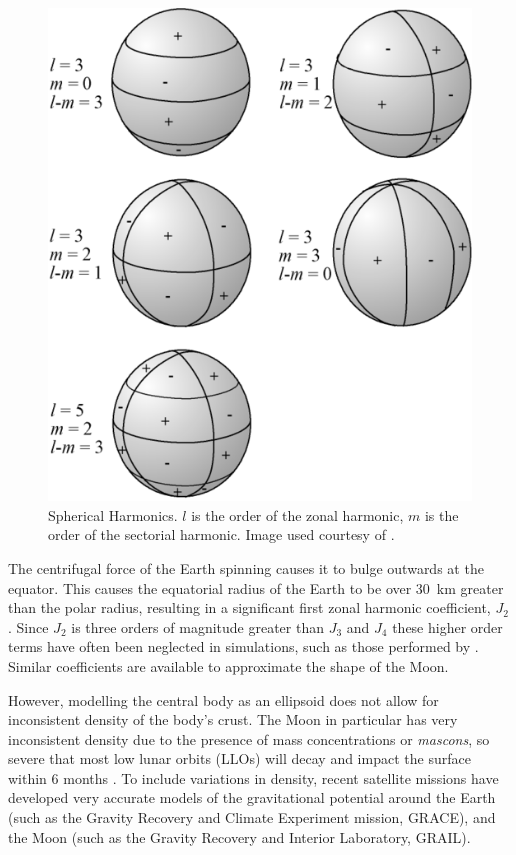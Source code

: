 \begin{figure}
\caption{Spherical Harmonics. $l$ is the order of the zonal harmonic, $m$ is the order of the sectorial harmonic. Image used courtesy of \cite{web_wiki_SphericalHarmonics}.}
\label{fig:Spherical-Harmonics}
\centering
\includegraphics[scale=0.5]{Images/515px-Harmoniques_spheriques_positif_negatif.png}
\end{figure}

The centrifugal force of the Earth spinning causes it to bulge outwards at the equator. This causes the equatorial radius of the Earth to be over 30~km greater than the polar radius, resulting in a significant first zonal harmonic coefficient, $J_{2}$. Since $J_{2}$ is three orders of magnitude greater than $J_{3}$ and $J_{4}$ these higher order terms have often been neglected in simulations, such as those performed by \textcite{Yang2007}. Similar coefficients are available to approximate the shape of the Moon.

However, modelling the central body as an ellipsoid does not allow for inconsistent density of the body's crust. The Moon in particular has very inconsistent density due to the presence of mass concentrations or \emph{mascons}, so severe that most low lunar orbits (LLOs) will decay and impact the surface within 6 months \parencite{Zeile2010}. To include variations in density, recent satellite missions have developed very accurate models of the gravitational potential around the Earth (such as the Gravity Recovery and Climate Experiment mission, GRACE), and the Moon (such as the Gravity Recovery and Interior Laboratory, GRAIL).

